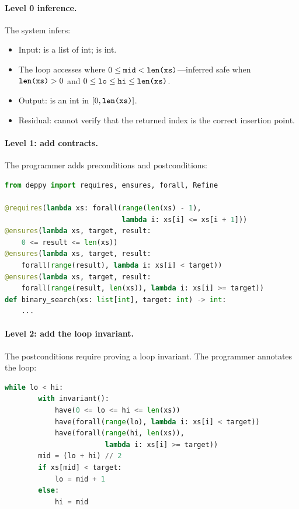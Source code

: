 \documentclass[11pt]{report}
\DeclareRobustCommand{\py}[1]{\texttt{\detokenize{#1}}}
\theoremstyle{definition}
\theoremstyle{plain}
\begin{document}
\paragraph{Level 0 inference.}
The system infers:
\begin{itemize}[nosep]
  \item Input: \py{xs} is a list of int; \py{target} is int.
  \item The loop accesses \py{xs[mid]} where
        $0 \leq \py{mid} < \py{len(xs)}$---inferred safe when
        $\py{len(xs)} > 0$ and $0 \leq \py{lo} \leq \py{hi} \leq
        \py{len(xs)}$.
  \item Output: \py{lo} is an int in $[0, \py{len(xs)}]$.
  \item Residual: cannot verify that the returned index is the correct
        insertion point.
\end{itemize}

\paragraph{Level 1: add contracts.}
The programmer adds preconditions and postconditions:
\begin{lstlisting}[style=deppy,language=Python]
from deppy import requires, ensures, forall, Refine

@requires(lambda xs: forall(range(len(xs) - 1),
                            lambda i: xs[i] <= xs[i + 1]))
@ensures(lambda xs, target, result:
    0 <= result <= len(xs))
@ensures(lambda xs, target, result:
    forall(range(result), lambda i: xs[i] < target))
@ensures(lambda xs, target, result:
    forall(range(result, len(xs)), lambda i: xs[i] >= target))
def binary_search(xs: list[int], target: int) -> int:
    ...
\end{lstlisting}

\paragraph{Level 2: add the loop invariant.}
The postconditions require proving a loop invariant. The programmer annotates
the loop:
\begin{lstlisting}[style=deppy,language=Python]
    while lo < hi:
        with invariant():
            have(0 <= lo <= hi <= len(xs))
            have(forall(range(lo), lambda i: xs[i] < target))
            have(forall(range(hi, len(xs)),
                        lambda i: xs[i] >= target))
        mid = (lo + hi) // 2
        if xs[mid] < target:
            lo = mid + 1
        else:
            hi = mid
\end{lstlisting}
\end{document}
